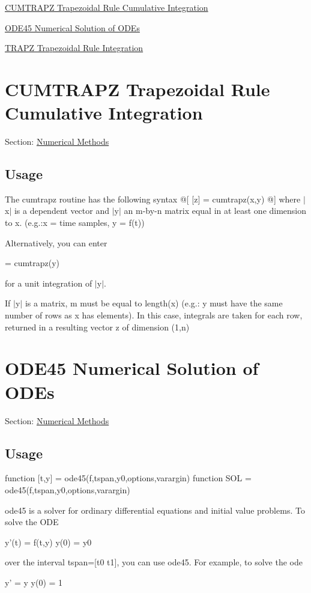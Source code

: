 
\begin{DoxyItemize}
\item \hyperlink{num_cumtrapz}{C\-U\-M\-T\-R\-A\-P\-Z Trapezoidal Rule Cumulative Integration}  
\item \hyperlink{num_ode45}{O\-D\-E45 Numerical Solution of O\-D\-Es}  
\item \hyperlink{num_trapz}{T\-R\-A\-P\-Z Trapezoidal Rule Integration}  
\end{DoxyItemize}\hypertarget{num_cumtrapz}{}\section{C\-U\-M\-T\-R\-A\-P\-Z Trapezoidal Rule Cumulative Integration}\label{num_cumtrapz}
Section\-: \hyperlink{sec_num}{Numerical Methods} \hypertarget{vtkwidgets_vtkxyplotwidget_Usage}{}\subsection{Usage}\label{vtkwidgets_vtkxyplotwidget_Usage}
The cumtrapz routine has the following syntax @\mbox{[} \mbox{[}z\mbox{]} = cumtrapz(x,y) @\mbox{]} where $|$x$|$ is a dependent vector and $|$y$|$ an m-\/by-\/n matrix equal in at least one dimension to x. (e.\-g.\-:x = time samples, y = f(t))

Alternatively, you can enter \begin{DoxyVerb}      [z] = cumtrapz(y) 
\end{DoxyVerb}
 for a unit integration of $|$y$|$.

If $|$y$|$ is a matrix, m must be equal to length(x) (e.\-g.\-: y must have the same number of rows as x has elements). In this case, integrals are taken for each row, returned in a resulting vector z of dimension (1,n) \hypertarget{num_ode45}{}\section{O\-D\-E45 Numerical Solution of O\-D\-Es}\label{num_ode45}
Section\-: \hyperlink{sec_num}{Numerical Methods} \hypertarget{vtkwidgets_vtkxyplotwidget_Usage}{}\subsection{Usage}\label{vtkwidgets_vtkxyplotwidget_Usage}
function \mbox{[}t,y\mbox{]} = ode45(f,tspan,y0,options,varargin) function S\-O\-L = ode45(f,tspan,y0,options,varargin)

ode45 is a solver for ordinary differential equations and initial value problems. To solve the O\-D\-E \begin{DoxyVerb}      y'(t) =  f(t,y)
      y(0)  =  y0
\end{DoxyVerb}
 over the interval tspan=\mbox{[}t0 t1\mbox{]}, you can use ode45. For example, to solve the ode \begin{DoxyVerb} y'   =  y
 y(0) =  1
\end{DoxyVerb}


